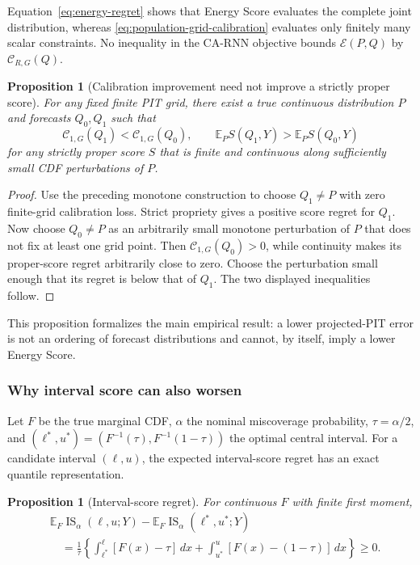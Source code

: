 \documentclass[11pt]{article}
\newtheorem{proposition}[definition]{Proposition}
\newcommand{\E}{\mathbb{E}}
\begin{document}
Equation~\eqref{eq:energy-regret} shows that Energy Score evaluates the complete
joint distribution, whereas \eqref{eq:population-grid-calibration} evaluates
only finitely many scalar constraints. No inequality in the CA-RNN objective
bounds $\mathcal E(P,Q)$ by $\mathcal C_{R,G}(Q)$.

\begin{proposition}[Calibration improvement need not improve a strictly proper score]
For any fixed finite PIT grid, there exist a true continuous distribution $P$ and
forecasts $Q_0,Q_1$ such that
\[
 \mathcal C_{1,G}(Q_1)<\mathcal C_{1,G}(Q_0),
 \qquad
 \E_P S(Q_1,Y)>\E_P S(Q_0,Y)
\]
for any strictly proper score $S$ that is finite and continuous along sufficiently
small CDF perturbations of $P$.
\end{proposition}

\begin{proof}
Use the preceding monotone construction to choose $Q_1\neq P$ with zero
finite-grid calibration loss. Strict propriety gives a positive score regret for
$Q_1$. Now choose $Q_0\neq P$ as an arbitrarily small monotone perturbation of
$P$ that does not fix at least one grid point. Then
$\mathcal C_{1,G}(Q_0)>0$, while continuity makes its proper-score regret
arbitrarily close to zero. Choose the perturbation small enough that its regret
is below that of $Q_1$. The two displayed inequalities follow.
\end{proof}

This proposition formalizes the main empirical result: a lower projected-PIT
error is not an ordering of forecast distributions and cannot, by itself, imply a
lower Energy Score.

\subsubsection{Why interval score can also worsen}

Let $F$ be the true marginal CDF, $\alpha$ the nominal miscoverage probability,
$\tau=\alpha/2$, and $(\ell^*,u^*)=(F^{-1}(\tau),F^{-1}(1-\tau))$ the optimal
central interval. For a candidate interval $(\ell,u)$, the expected interval-score
regret has an exact quantile representation.

\begin{proposition}[Interval-score regret]
For continuous $F$ with finite first moment,
\begin{align}
 &\E_F\operatorname{IS}_\alpha(\ell,u;Y)
 -\E_F\operatorname{IS}_\alpha(\ell^*,u^*;Y) \\
 &\quad=\frac{1}{\tau}
 \left\{
 \int_{\ell^*}^{\ell}[F(x)-\tau]\,dx
 +\int_{u^*}^{u}[F(x)-(1-\tau)]\,dx
 \right\}\geq0.
 \label{eq:interval-regret}
\end{align}
\end{proposition}
\end{document}
